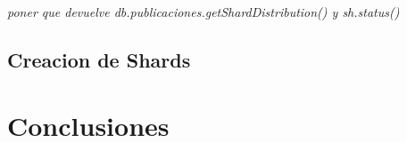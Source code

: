 \documentclass[a4paper, 10pt, twoside]{article}
\begin{document}
\emph{poner que devuelve \color{red}db.publicaciones.getShardDistribution() y sh.status() } 

\subsection{Creacion de Shards}

\section{Conclusiones}
\end{document}

